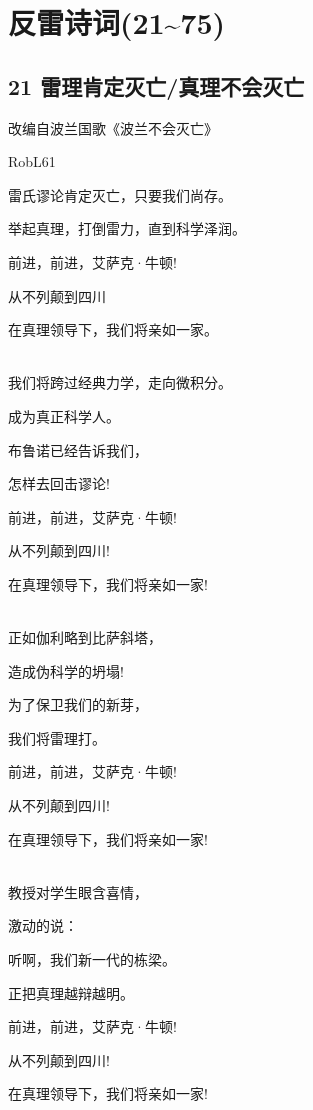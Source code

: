 \documentclass[UTF8,12pt,oneside]{ctexbook}
\begin{document}
        
    
    \chapter{反雷诗词(21\textasciitilde75)}
    
    \large
    
    \section{21 雷理肯定灭亡/真理不会灭亡}
    \begin{center}
        \Large \kaishu
        改编自波兰国歌《波兰不会灭亡》
        \songti \large
        
        RobL61
    \end{center}
       
    \begin{center}
        雷氏谬论肯定灭亡，只要我们尚存。
    
        举起真理，打倒雷力，直到科学泽润。
        
        前进，前进，艾萨克·牛顿!
        
        从不列颠到四川
        
        在真理领导下，我们将亲如一家。
        
        ~\\
        我们将跨过经典力学，走向微积分。
        
        成为真正科学人。
        
        布鲁诺已经告诉我们，
        
        怎样去回击谬论!
        
        前进，前进，艾萨克·牛顿!
        
        从不列颠到四川!
        
        在真理领导下，我们将亲如一家!
        
        ~\\
        正如伽利略到比萨斜塔，
        
        造成伪科学的坍塌!
        
        为了保卫我们的新芽，
        
        我们将雷理打。
        
        前进，前进，艾萨克·牛顿!
        
        从不列颠到四川!
        
        在真理领导下，我们将亲如一家!
        
        ~\\
        教授对学生眼含喜情，
        
        激动的说：
        
        听啊，我们新一代的栋梁。
        
        正把真理越辩越明。
        
        前进，前进，艾萨克·牛顿!
        
        从不列颠到四川!
        
        在真理领导下，我们将亲如一家!
        
        ~\\
    \end{center}
    
\end{document}
